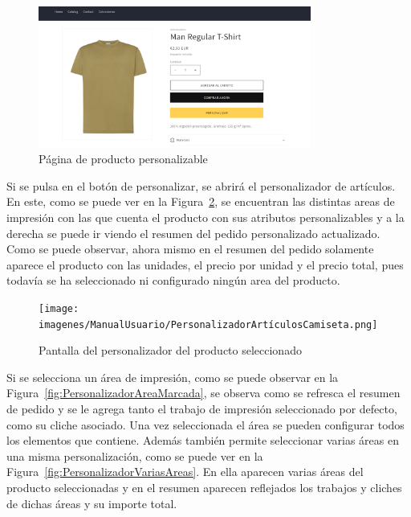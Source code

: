 \documentclass[11pt]{article}
\begin{document}
\begin{figure}[H]
    \centering
    \includegraphics[width=0.8\textwidth]{imagenes/ManualUsuario/PaginaProductoConPersonalizacion.png}
    \caption{\label{fig:ProductoPersonalizable}Página de producto personalizable}
    \vspace{\fill}
\end{figure}

Si se pulsa en el botón de personalizar, se abrirá el personalizador de artículos. En este, como se puede ver en la Figura~\ref{fig:Personalizador}, se encuentran
las distintas areas de impresión con las que cuenta el producto con sus atributos personalizables y a la derecha se puede ir viendo el resumen del pedido personalizado actualizado.
Como se puede observar, ahora mismo en el resumen del pedido solamente aparece el producto con las unidades, el precio por unidad y el precio total, pues todavía se ha seleccionado ni configurado
ningún area del producto.

\begin{figure}[H]
    \centering
    \texttt{[image: imagenes/ManualUsuario/PersonalizadorArtículosCamiseta.png]}
    \caption{\label{fig:Personalizador}Pantalla del personalizador del producto seleccionado}
    \vspace{\fill}
\end{figure}

Si se selecciona un área de impresión, como se puede observar en la Figura~\ref{fig:PersonalizadorAreaMarcada}, se observa como se refresca el resumen de pedido y se le agrega tanto el trabajo de impresión
seleccionado por defecto, como su cliche asociado. Una vez seleccionada el área se pueden configurar todos los elementos que contiene. Además también permite seleccionar varias áreas en una misma personalización, como 
se puede ver en la Figura~\ref{fig:PersonalizadorVariasAreas}. En ella aparecen varias áreas del producto seleccionadas y en el resumen aparecen reflejados los trabajos y cliches de dichas áreas y su importe total.
\end{document}
